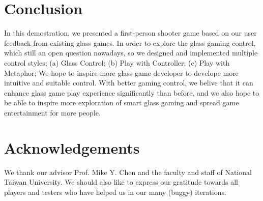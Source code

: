 \documentclass{sigchi}
\begin{document}


\section{Conclusion}
In this demostration, we presented a first-person shooter game based on our user feedback from existing glass games. In order to explore the glass gaming control, which still an open question nowadays, so we designed and implemented multiple control styles; (a) Glass Control; (b) Play with Controller; (c) Play with Metaphor; We hope to inspire more glass game developer to develope more intuitive and suitable control. With better gaming control, we belive that it can enhance glass game play experience significantly than before, and we also hope to be able to inspire more exploration of smart glass gaming and spread game entertainment for more people.


\section{Acknowledgements}
We thank our advisor Prof. Mike Y. Chen and the faculty and staff of National Taiwan University. We should also like to express our gratitude towards all players and testers who have helped us in our many (buggy) iterations.

\balance



\end{document}
